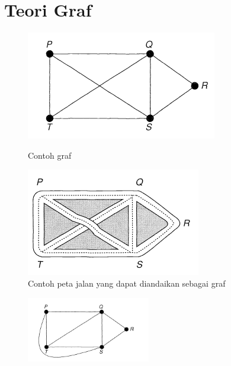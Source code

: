 \section{Teori Graf}

\begin{figure}[!htb]
\begin{minipage}{0.48\textwidth}
	\centering
	\includegraphics[width=.7\linewidth]{gambar/graph_example}
	\caption{Contoh graf \citep{wilson1996}}
	\label{gambar:graph_example}
\end{minipage}\hfill
\begin{minipage}{0.48\textwidth}
	\centering
	\includegraphics[width=.7\linewidth]{gambar/graph_example_2}
	\caption{Contoh peta jalan yang dapat diandaikan sebagai graf \citep{wilson1996}}
	\label{gambar:graph_example_2}
\end{minipage}
\end{figure}

\begin{figure}[H]
	\centering
	\includegraphics[keepaspectratio, width=0.48\textwidth]{gambar/graph_example_3}
	\caption{}
	\label{gambar:graph_example_3}
\end{figure}

